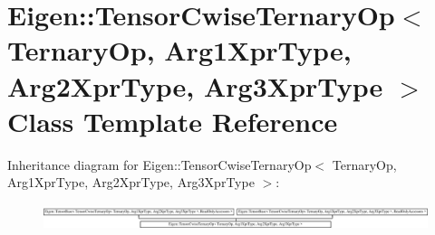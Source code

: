 \hypertarget{class_eigen_1_1_tensor_cwise_ternary_op}{}\section{Eigen\+:\+:Tensor\+Cwise\+Ternary\+Op$<$ Ternary\+Op, Arg1\+Xpr\+Type, Arg2\+Xpr\+Type, Arg3\+Xpr\+Type $>$ Class Template Reference}
\label{class_eigen_1_1_tensor_cwise_ternary_op}
Inheritance diagram for Eigen\+:\+:Tensor\+Cwise\+Ternary\+Op$<$ Ternary\+Op, Arg1\+Xpr\+Type, Arg2\+Xpr\+Type, Arg3\+Xpr\+Type $>$\+:\begin{figure}[H]
\begin{center}
\leavevmode
\includegraphics[height=0.743692cm]{class_eigen_1_1_tensor_cwise_ternary_op}
\end{center}
\end{figure}
